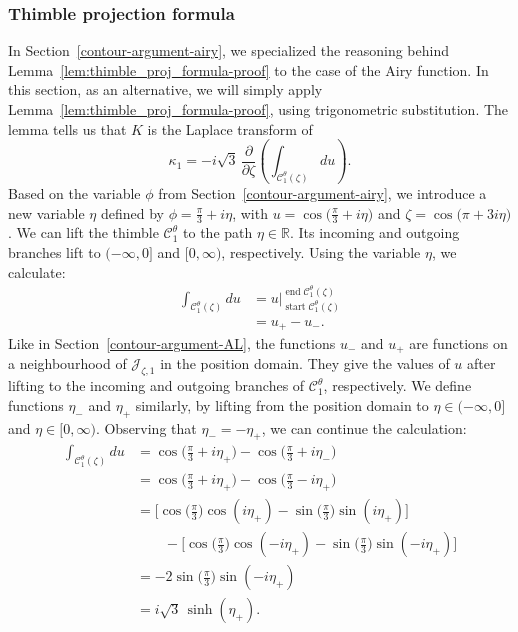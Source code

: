 \documentclass{article}
\newcommand{\R}{\mathbb{R}}
\theoremstyle{definition}
\theoremstyle{plain}
\begin{document}
\subsubsection{Thimble projection formula}\label{thimble-proj-airy}
%
In Section~\ref{contour-argument-airy}, we specialized the reasoning behind Lemma~\ref{lem:thimble_proj_formula-proof} to the case of the Airy function. In this section, as an alternative, we will simply apply Lemma~\ref{lem:thimble_proj_formula-proof}, using trigonometric substitution. The lemma tells us that $K$ is the Laplace transform of
\[ \kappa_1 = -i\sqrt{3}\,\frac{\partial}{\partial \zeta}\left(\int_{\mathcal{C}_1^\theta(\zeta)} du\right). \]
Based on the variable $\phi$ from Section~\ref{contour-argument-airy}, we introduce a new variable $\eta$ defined by $\phi = \tfrac{\pi}{3} + i\eta$, with $u = \cos\big(\tfrac{\pi}{3} + i\eta\big)$ and $\zeta = \cos\big(\pi + 3i\eta\big)$. We can lift the thimble $\mathcal{C}^\theta_1$ to the path $\eta \in \R$. Its incoming and outgoing branches lift to $(-\infty, 0]$ and $[0, \infty)$, respectively. Using the variable $\eta$, we calculate:
\begin{align*}
\int_{\mathcal{C}_1^\theta(\zeta)} du & = u \Big|_{\operatorname{start} \mathcal{C}^\theta_1(\zeta)}^{\operatorname{end} \mathcal{C}^\theta_1(\zeta)} \\
& = u_+ - u_-.
\end{align*}
Like in Section~\ref{contour-argument-AL}, the functions $u_-$ and $u_+$ are functions on a neighbourhood of $\mathcal{J}_{\zeta, 1}$ in the position domain. They give the values of $u$ after lifting to the incoming and outgoing branches of $\mathcal{C}^\theta_1$, respectively. We define functions $\eta_-$ and $\eta_+$ similarly, by lifting from the position domain to $\eta \in (-\infty, 0]$ and $\eta \in [0, \infty)$. Observing that $\eta_- = -\eta_+$, we can continue the calculation:
\begin{align*}
\int_{\mathcal{C}_1^\theta(\zeta)} du & = \cos\big(\tfrac{\pi}{3} + i\eta_+\big) - \cos\big(\tfrac{\pi}{3} + i\eta_-\big) \\
& = \cos\big(\tfrac{\pi}{3} + i\eta_+\big) - \cos\big(\tfrac{\pi}{3} - i\eta_+\big) \\
& = \big[\cos\big(\tfrac{\pi}{3}\big) \cos(i\eta_+) - \sin\big(\tfrac{\pi}{3}\big) \sin(i\eta_+)\big] \\
& \qquad - \big[\cos\big(\tfrac{\pi}{3}\big) \cos(-i\eta_+) - \sin\big(\tfrac{\pi}{3}\big) \sin(-i\eta_+)\big] \\
& = -2 \sin\big(\tfrac{\pi}{3}\big) \sin(-i\eta_+) \\
& = i\sqrt{3}\,\sinh(\eta_+).
\end{align*}
\end{document}
